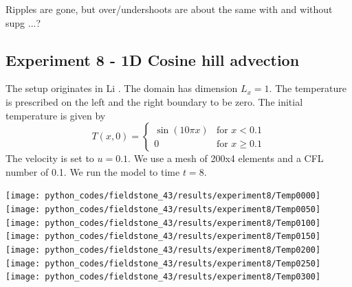 Ripples are gone, but over/undershoots are about the same with and without supg ...?


\subsection*{Experiment 8 - 1D Cosine hill advection}

The setup originates in Li \cite[ex 5.2]{li06}.
The domain has dimension $L_x=1$. 
The temperature is prescribed on the left and the right boundary to be zero. 
The initial temperature is given by
\[
T(x,0)=
\left\{
\begin{array}{ll}
\sin (10 \pi x) & \textrm{for } x< 0.1 \\
0               & \textrm{for } x\geq 0.1 
\end{array}
\right.
\]
The velocity is set to $u=0.1$.
We use a mesh of 200x4 elements and a CFL number of 0.1. 
We run the model to time $t=8$.


\begin{center}
\texttt{[image: python\_codes/fieldstone\_43/results/experiment8/Temp0000]}
\texttt{[image: python\_codes/fieldstone\_43/results/experiment8/Temp0050]}
\texttt{[image: python\_codes/fieldstone\_43/results/experiment8/Temp0100]}
\texttt{[image: python\_codes/fieldstone\_43/results/experiment8/Temp0150]}\\
\texttt{[image: python\_codes/fieldstone\_43/results/experiment8/Temp0200]}
\texttt{[image: python\_codes/fieldstone\_43/results/experiment8/Temp0250]}
\texttt{[image: python\_codes/fieldstone\_43/results/experiment8/Temp0300]}
\end{center}




